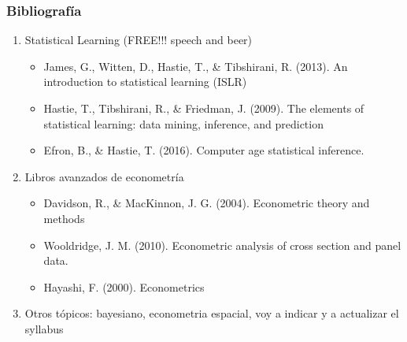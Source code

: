 \documentclass[
  shownotes,
  xcolor={svgnames},
  hyperref={colorlinks,citecolor=DarkBlue,linkcolor=DarkRed,urlcolor=DarkBlue}
  ]{beamer}
\begin{document}
\begin{frame}
\end{frame}


\begin{frame}
\frametitle{Bibliografía}


\begin{enumerate}
  \item Statistical Learning (FREE!!! speech and beer)
  \begin{itemize}
    \small
    \item James, G., Witten, D., Hastie, T., \& Tibshirani, R. (2013). An introduction to statistical learning (ISLR)
    \item Hastie, T., Tibshirani, R., \& Friedman, J. (2009). The elements of statistical learning: data mining, inference, and prediction
    \item Efron, B., \& Hastie, T. (2016). Computer age statistical inference.
  \end{itemize}
  \bigskip
  \item Libros avanzados de econometría
  \begin{itemize}
    \small
    \item Davidson, R., \& MacKinnon, J. G. (2004). Econometric theory and methods 
    \item Wooldridge, J. M. (2010). Econometric analysis of cross section and panel data. 
    \item Hayashi, F. (2000). Econometrics
  \end{itemize}
\bigskip
  \item Otros tópicos: bayesiano, econometria espacial, voy a indicar y a actualizar el syllabus
  \end{enumerate}





\end{frame}
\end{document}
